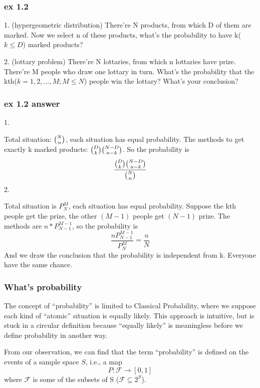 \documentclass{beamer}
\begin{document}
\begin{frame}
    \frametitle{ex 1.2}
    1. (hypergeometric distribution) There're N products, from which D of them are marked. Now we select n of these products, what's the probability to have k($k\leq D$) marked products?\par\vspace{0.3cm}
    2. (lottary problem) There're N lottaries, from which n lottaries have prize. There're M people who draw one lottary in turn. What's the probability that the kth($k=1,2,...,M; M\leq N $) people win the lottary? What's your conclusion?
    
\end{frame}

\begin{frame}
    \frametitle{ex 1.2 answer}
    1.\par
    Total situation: $\tbinom{N}{n}$, each situation has equal probability. The methods to get exactly k marked products: $\tbinom{D}{k}\tbinom{N-D}{n-k}$. So the probability is 
    \[\frac{\tbinom{D}{k}\tbinom{N-D}{n-k}}{\tbinom{N}{n}}\]
    2. \par
    Total situation is $P_{N}^{M}$, each situation has equal probability. Suppose the kth people get the prize, the other $(M-1)$ people get $(N-1)$ prize. The methods are $n*P_{N-1}^{M-1}$, so the probability is
    \[\frac{nP_{N-1}^{M-1}}{P_{N}^{M}}=\frac{n}{N}\]
    And we draw the conclusion that the probability is independent from k. Everyone have the same chance.
    
    
\end{frame}


\begin{frame} 

\frametitle{What's probability}
The concept of ``probability'' is limited to Classical Probability, where we suppose each kind of ``atomic'' situation is equally likely. This approach is intuitive, but is stuck in a circular definition because ``equally likely'' is meaningless before we define probability in another way.\par
\vspace{0.3cm}
From our observation, we can find that the term ``probability'' is defined on the events of a sample space $S$, i.e., a map
\[P: \mathscr{F}\rightarrow [0,1]\]
where $\mathscr{F}$ is some of the subsets of S ($\mathscr{F}\subseteq 2^S $).

\end{frame}
\end{document}
